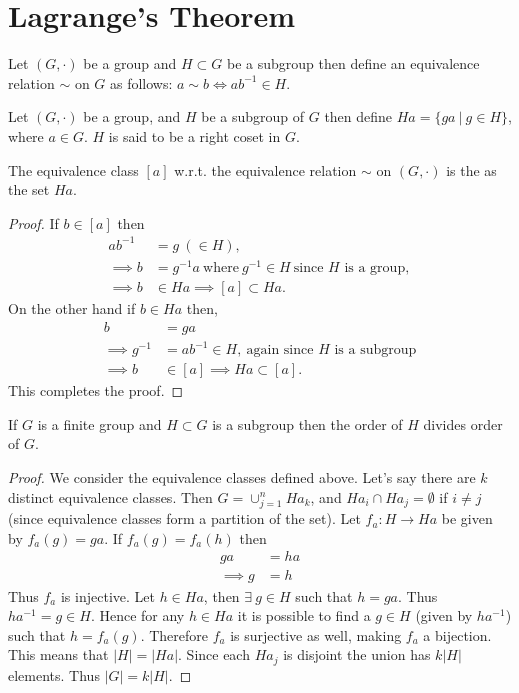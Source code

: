 \section{Lagrange's Theorem}
\begin{definition}
  Let $(G,\cdot)$ be a group and $H\subset G$ be a subgroup then define an equivalence relation $\sim$ on $G$ as follows: $a\sim b \iff ab^{-1}\in H$.
\end{definition}
\begin{definition}
  Let $(G,\cdot)$ be a group, and $H$ be a subgroup of $G$ then define $Ha = \{ga\ |\ g\in H\}$, where $a\in G$. $H$ is said to be a right coset in $G$.  
\end{definition}
\begin{proposition}
  The equivalence class $[a]$ w.r.t. the equivalence relation $\sim$ on $(G,\cdot)$ is the as the set $Ha$. 
\end{proposition}
\begin{proof}
  If $b\in [a]$ then
  \begin{align*}
    ab^{-1} &= g\ (\in H),\\
    \implies b &= g^{-1}a\ \text{where}\ g^{-1}\in H\ \text{since $H$ is a group},\\ 
    \implies b &\in Ha \implies [a]\subset Ha.
  \end{align*}
  On the other hand if $b\in Ha$ then,
  \begin{align*}
    b &= ga\\
    \implies g^{-1} &= ab^{-1}\in H,\ \text{again since $H$ is a subgroup}\\
    \implies b &\in [a] \implies Ha \subset [a].
  \end{align*}
  This completes the proof.
\end{proof}
\begin{theorem}
  If $G$ is a finite group and $H\subset G$ is a subgroup then the order of $H$ divides order of $G$.
\end{theorem}
\begin{proof}
  We consider the equivalence classes defined above. Let's say there are $k$ distinct equivalence classes. Then $G = \cup_{j=1}^{n} Ha_k$, and $Ha_i \cap Ha_j = \emptyset$ if $i\neq j$ (since equivalence classes form a partition of the set). Let $f_{a}: H \to Ha$ be given by $f_a(g) = ga$. If $f_a(g) = f_a(h)$ then
  \begin{align*}
    ga &= ha\\
    \implies g &= h
  \end{align*}
  Thus $f_a$ is injective. Let $h\in Ha$, then $\exists\ g\in H$ such that $h = ga$. Thus $ha^{-1} = g \in H$. Hence for any $h\in Ha$ it is possible to find a $g\in H$ (given by $ha^{-1}$) such that $h = f_a(g)$. Therefore $f_a$ is surjective as well, making $f_a$ a bijection. This means that $|H| = |Ha|$. Since each $Ha_j$ is disjoint the union has $k|H|$ elements. Thus $|G| = k|H|$.
\end{proof}
